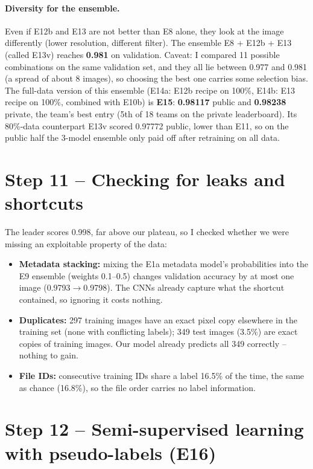 \documentclass[11pt,a4paper]{article}
\begin{document}
\paragraph{Diversity for the ensemble.} Even if E12b and E13 are not better than E8 alone, they look at
the image differently (lower resolution, different filter). The ensemble E8 + E12b + E13 (called E13v)
reaches \textbf{0.981} on validation. Caveat: I compared 11 possible combinations on the same
validation set, and they all lie between 0.977 and 0.981 (a spread of about 8 images), so choosing the
best one carries some selection bias. The full-data version of this ensemble (E14a: E12b recipe on
100\%, E14b: E13 recipe on 100\%, combined with E10b) is \textbf{E15}: \textbf{0.98117} public and
\textbf{0.98238} private, the team's best entry (5th of 18 teams on the private leaderboard). Its
80\%-data counterpart E13v scored 0.97772 public, lower than E11, so on the public half the 3-model
ensemble only paid off after retraining on all data.

\section{Step 11 -- Checking for leaks and shortcuts}

The leader scores 0.998, far above our plateau, so I checked whether we were missing an
exploitable property of the data:
\begin{itemize}[leftmargin=*]
\item \textbf{Metadata stacking:} mixing the E1a metadata model's probabilities into the E9
ensemble (weights 0.1--0.5) changes validation accuracy by at most one image (0.9793$\to$0.9798). The
CNNs already capture what the shortcut contained, so ignoring it costs nothing.
\item \textbf{Duplicates:} 297 training images have an exact pixel copy elsewhere in the training set
(none with conflicting labels); 349 test images (3.5\%) are exact copies of training images. Our model
already predicts all 349 correctly -- nothing to gain.
\item \textbf{File IDs:} consecutive training IDs share a label 16.5\% of the time, the same as chance
(16.8\%), so the file order carries no label information.
\end{itemize}

\section{Step 12 -- Semi-supervised learning with pseudo-labels (E16)}
\end{document}
